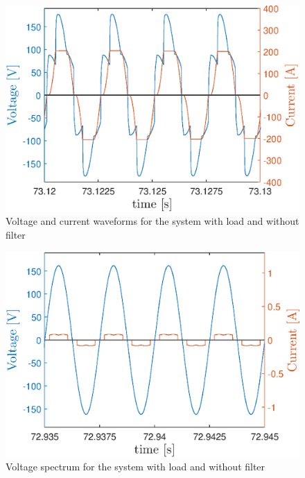 \begin{figure}[!h] %
	\centering
	\includegraphics[width=0.27\textheight]{Figures/artigo_unfilt_3.eps}
	\caption{Voltage and current waveforms for the system with load and without filter}
	\label{fig:artigo_unfilt_3.eps}
\end{figure}

\begin{figure}[!h] %
	\centering
	\includegraphics[width=0.27\textheight]{Figures/artigo_unfilt_4.eps}
	\caption{Voltage spectrum for the system with load and without filter}
	\label{fig:artigo_unfilt_4.eps}
\end{figure}

